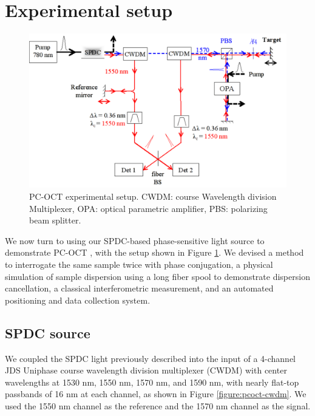 \section{Experimental setup}

\begin{figure}[t]
\begin{center}
\includegraphics[width=16cm]{figure-pcoct-setup.pdf}
\caption{PC-OCT experimental setup. CWDM: course Wavelength division Multiplexer, OPA: optical parametric amplifier, PBS: polarizing beam splitter.}
\label{figure:pcoct-setup}
\end{center}
\end{figure}

We now turn to using our SPDC-based phase-sensitive light source to demonstrate PC-OCT \cite{legouet-experimental}, with the setup shown in Figure \ref{figure:pcoct-setup}. We devised a method to interrogate the same sample twice with phase conjugation, a physical simulation of sample dispersion using a long fiber spool to demonstrate dispersion cancellation, a classical interferometric measurement, and an automated positioning and data collection system.

\subsection{SPDC source}

We coupled the SPDC light previously described into the input of a 4-channel JDS Uniphase course wavelength division multiplexer (CWDM) with center wavelengths at 1530 nm, 1550 nm, 1570 nm, and 1590 nm, with nearly flat-top passbands of 16 nm at each channel, as shown in Figure \ref{figure:pcoct-cwdm}. We used the 1550 nm channel as the reference and the 1570 nm channel as the signal.

